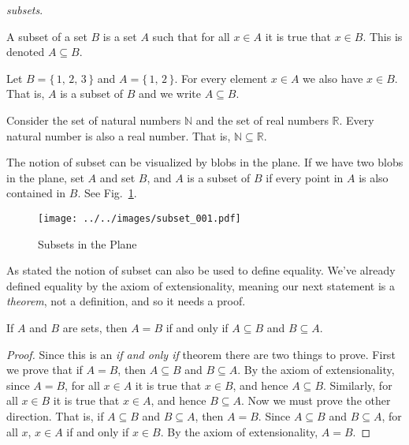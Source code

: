             \textit{subsets}.
            \begin{definition}
                A subset of a set $B$ is a set $A$ such that for all
                $x\in{A}$ it is true that $x\in{B}$. This is denoted
                $A\subseteq{B}$.
            \end{definition}
            \begin{example}
                Let $B=\{\,1,\,2,\,3\,\}$ and $A=\{\,1,\,2\,\}$. For every
                element $x\in{A}$ we also have $x\in{B}$. That is,
                $A$ is a subset of $B$ and we write $A\subseteq{B}$.
            \end{example}
            \begin{example}
                Consider the set of natural numbers $\mathbb{N}$ and the set of
                real numbers $\mathbb{R}$. Every natural number is also a
                real number. That is, $\mathbb{N}\subseteq\mathbb{R}$.
            \end{example}
            The notion of subset can be visualized by blobs in the plane.
            If we have two blobs in the plane, set $A$ and set $B$, and $A$ is
            a subset of $B$ if every point in $A$ is also contained in $B$.
            See Fig.~\ref{fig:subsets_in_plane}.
            \begin{figure}
                \centering
                \texttt{[image: ../../images/subset\_001.pdf]}
                \caption{Subsets in the Plane}
                \label{fig:subsets_in_plane}
            \end{figure}
            \par\hfill\par
            As stated the notion of subset can also be used to define equality.
            We've already defined equality by the axiom of extensionality,
            meaning our next statement is a \textit{theorem}, not a definition,
            and so it needs a proof.
            \begin{theorem}
                If $A$ and $B$ are sets, then $A=B$ if and only if
                $A\subseteq{B}$ and $B\subseteq{A}$.
            \end{theorem}
            \begin{proof}
                Since this is an \textit{if and only if} theorem there are two
                things to prove. First we prove that if $A=B$, then
                $A\subseteq{B}$ and $B\subseteq{A}$. By the axiom of
                extensionality, since $A=B$,
                for all $x\in{A}$ it is true that $x\in{B}$, and hence
                $A\subseteq{B}$. Similarly, for all $x\in{B}$ it is true that
                $x\in{A}$, and hence $B\subseteq{A}$. Now we must prove the
                other direction. That is, if $A\subseteq{B}$ and
                $B\subseteq{A}$, then $A=B$. Since $A\subseteq{B}$ and
                $B\subseteq{A}$, for all $x$, $x\in{A}$ if and only if
                $x\in{B}$. By the axiom of extensionality, $A=B$.
            \end{proof}
